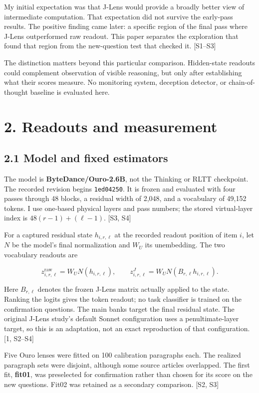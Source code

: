 \documentclass[
  11pt,
  a4paper,
]{article}
\begin{document}
My initial expectation was that J-Lens would provide a broadly better
view of intermediate computation. That expectation did not survive the
early-pass results. The positive finding came later: a specific region
of the final pass where J-Lens outperformed raw readout. This paper
separates the exploration that found that region from the new-question
test that checked it. {[}S1--S3{]}

The distinction matters beyond this particular comparison. Hidden-state
readouts could complement observation of visible reasoning, but only
after establishing what their scores measure. No monitoring system,
deception detector, or chain-of-thought baseline is evaluated here.

\section{2. Readouts and measurement}\label{readouts-and-measurement}

\subsection{2.1 Model and fixed
estimators}\label{model-and-fixed-estimators}

The model is \textbf{ByteDance/Ouro-2.6B}, not the Thinking or RLTT
checkpoint. The recorded revision begins \texttt{1ed04250}. It is frozen
and evaluated with four passes through 48 blocks, a residual width of
2,048, and a vocabulary of 49,152 tokens. I use one-based physical
layers and pass numbers; the stored virtual-layer index is
\(48(r-1)+(\ell-1)\). {[}S3, S4{]}

For a captured residual state \(h_{i,r,\ell}\) at the recorded readout
position of item \(i\), let \(N\) be the model's final normalization and
\(W_U\) its unembedding. The two vocabulary readouts are

\[
z^{\mathrm{raw}}_{i,r,\ell}=W_U N(h_{i,r,\ell}), \qquad
z^{J}_{i,r,\ell}=W_U N(B_{r,\ell}h_{i,r,\ell}).
\]

Here \(B_{r,\ell}\) denotes the frozen J-Lens matrix actually applied to
the state. Ranking the logits gives the token readout; no task
classifier is trained on the confirmation questions. The main banks
target the final residual state. The original J-Lens study's default
Sonnet configuration uses a penultimate-layer target, so this is an
adaptation, not an exact reproduction of that configuration. {[}1,
S2--S4{]}

Five Ouro lenses were fitted on 100 calibration paragraphs each. The
realized paragraph sets were disjoint, although some source articles
overlapped. The first fit, \textbf{fit01}, was preselected for
confirmation rather than chosen for its score on the new questions.
Fit02 was retained as a secondary comparison. {[}S2, S3{]}
\end{document}
